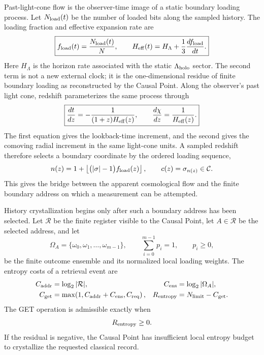 \documentclass[11pt]{article}
\newcommand{\Lholo}{\Lambda_{\rm holo}}
\newcommand{\Nbits}{N}
\begin{document}
Past-light-cone flow is the observer-time image of a static boundary loading
process.  Let $N_{\rm load}(t)$ be the number of loaded bits along the sampled
history.  The loading fraction and effective expansion rate are
\begin{equation}
\label{eq:section-seven-loading-law}
 \boxed{
 f_{\rm load}(t)
 =
 \frac{N_{\rm load}(t)}{\Nbits},
 \qquad
 H_{\rm eff}(t)
 =
 H_{\Lambda}+\frac{1}{3}\frac{df_{\rm load}}{dt}.
 }
\end{equation}
Here $H_{\Lambda}$ is the horizon rate associated with the static
$\Lholo$ sector.  The second term is not a new external clock; it is the
one-dimensional residue of finite boundary loading as reconstructed by the
Causal Point.  Along the observer's past light cone, redshift parameterizes the
same process through
\begin{equation}
\label{eq:section-seven-past-light-cone-flow}
 \boxed{
 \frac{dt}{dz}
 =
 -\frac{1}{(1+z)H_{\rm eff}(z)},
 \qquad
 \frac{d\chi}{dz}
 =
 \frac{1}{H_{\rm eff}(z)}.
 }
\end{equation}
The first equation gives the lookback-time increment, and the second gives the
comoving radial increment in the same light-cone units.  A sampled redshift
therefore selects a boundary coordinate by the ordered loading sequence,
\begin{equation}
\label{eq:section-seven-coordinate-flow}
 n(z)
 =
 1+
 \left\lfloor\bigl(|\sigma|-1\bigr)f_{\rm load}(z)\right\rfloor,
 \qquad
 c(z)=\sigma_{n(z)}\in\mathcal C.
\end{equation}
This gives the bridge between the apparent cosmological flow and the finite
boundary address on which a measurement can be attempted.

History crystallization begins only after such a boundary address has been
selected.  Let $\mathcal R$ be the finite register visible to the Causal Point,
let $A\in\mathcal R$ be the selected address, and let
\begin{equation}
\label{eq:section-seven-outcome-ensemble}
 \Omega_A
 =
 \{\omega_0,\omega_1,\ldots,\omega_{m-1}\},
 \qquad
 \sum_{i=0}^{m-1}p_i=1,
 \qquad
 p_i\ge0,
\end{equation}
be the finite outcome ensemble and its normalized local loading weights.  The
entropy costs of a retrieval event are
\begin{align}
\label{eq:section-seven-retrieval-costs}
 C_{\rm addr}
 &=
 \log_2|\mathcal R|,
 &
 C_{\rm ens}
 &=
 \log_2|\Omega_A|,\notag\\
 C_{\rm get}
 &=
 \max\!\left(1,C_{\rm addr}+C_{\rm ens},C_{\rm req}\right),
 &
 R_{\rm entropy}
 &=
 N_{\rm limit}-C_{\rm get}.
\end{align}
The GET operation is admissible exactly when
\begin{equation}
\label{eq:section-seven-retrieval-admissibility}
 R_{\rm entropy}\ge0.
\end{equation}
If the residual is negative, the Causal Point has insufficient local entropy
budget to crystallize the requested classical record.
\end{document}
